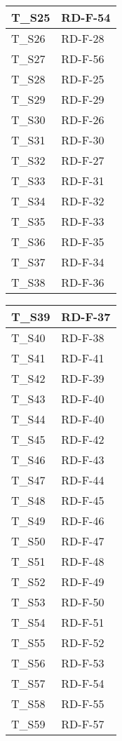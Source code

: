 \begin{center}
\begin{tabular}{|m{6em}|m{8em}|}
        \hline
        T\_S25 & RD-F-54\\
        \hline
        T\_S26 & RD-F-28\\
        \hline
        T\_S27 & RD-F-56\\
        \hline
        T\_S28 & RD-F-25\\
        \hline
        T\_S29 & RD-F-29\\
        \hline
        T\_S30 & RD-F-26\\
        \hline
        T\_S31 & RD-F-30\\
        \hline
        T\_S32 & RD-F-27\\
        \hline
        T\_S33 & RD-F-31\\
        \hline
        T\_S34 & RD-F-32\\
        \hline
        T\_S35 & RD-F-33\\
        \hline
        T\_S36 & RD-F-35\\
        \hline
        T\_S37 & RD-F-34\\
        \hline
        T\_S38 & RD-F-36\\
        \hline
    \end{tabular}
    \newpage
    \renewcommand{\arraystretch}{1.8}
    \begin{tabular}{|m{6em}|m{8em}|}
        \hline
        T\_S39 & RD-F-37\\
        \hline
        T\_S40 & RD-F-38\\
        \hline
        T\_S41 & RD-F-41\\
        \hline
        T\_S42 & RD-F-39\\
        \hline
        T\_S43 & RD-F-40\\
        \hline
        T\_S44 & RD-F-40\\
        \hline
        T\_S45 & RD-F-42\\
        \hline
        T\_S46 & RD-F-43\\
        \hline
        T\_S47 & RD-F-44\\
        \hline
        T\_S48 & RD-F-45\\
        \hline
        T\_S49 & RD-F-46\\
        \hline
        T\_S50 & RD-F-47\\
        \hline
        T\_S51 & RD-F-48\\
        \hline
        T\_S52 & RD-F-49\\
        \hline
        T\_S53 & RD-F-50\\
        \hline
        T\_S54 & RD-F-51\\
        \hline
        T\_S55 & RD-F-52\\
        \hline
        T\_S56 & RD-F-53\\
        \hline
        T\_S57 & RD-F-54\\
        \hline
        T\_S58 & RD-F-55\\
        \hline
        T\_S59 & RD-F-57\\
        \hline
    \end{tabular}
\end{center}